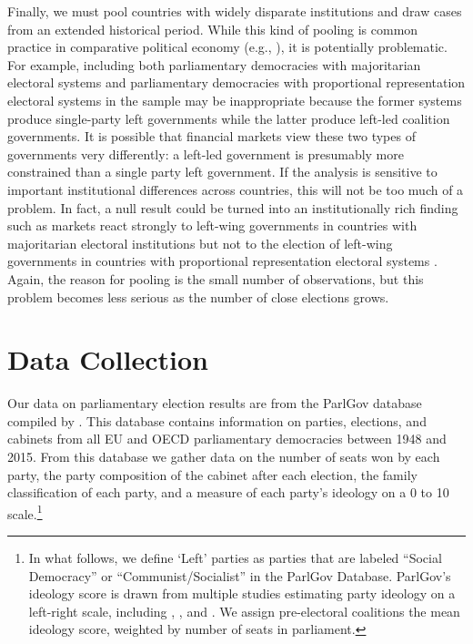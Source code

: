 \documentclass[12pt]{article}
\begin{document}
Finally, we must pool countries with widely disparate institutions and draw cases from an extended historical period. While this kind of pooling is common practice in comparative political economy (e.g., \citet{Beck1995}), it is potentially problematic. For example, including both parliamentary democracies with majoritarian electoral systems and parliamentary democracies with proportional representation electoral systems in the sample may be inappropriate because the former systems produce single-party left governments while the latter produce left-led coalition governments. It is possible that financial markets view these two types of governments very differently: a left-led government is presumably more constrained than a single party left government. If the analysis is sensitive to important institutional differences across countries, this will not be too much of a problem. In fact, a null result could be turned into an institutionally rich finding such as markets react strongly to left-wing governments in countries with majoritarian electoral institutions but not to the election of left-wing governments in countries with proportional representation electoral systems \citep{Freeman2000}. Again, the reason for pooling is the small number of observations, but this problem becomes less serious as the number of close elections grows. 

\section{Data Collection}

Our data on parliamentary election results are from the ParlGov database compiled by \citet{Doring2018}. This database contains information on parties, elections, and cabinets from all EU and OECD parliamentary democracies between 1948 and 2015. From this database we gather data on the number of seats won by each party, the party composition of the cabinet after each election, the family classification of each party, and a measure of each party's ideology on a 0 to 10 scale.\footnote{In what follows, we define `Left' parties as parties that are labeled ``Social Democracy'' or ``Communist/Socialist'' in the ParlGov Database. ParlGov's ideology score is drawn from multiple studies estimating party ideology on a left-right scale, including \citet{Castles1984}, \citet{Huber1995}, and \citet{Benoit2006}. We assign pre-electoral coalitions the mean ideology score, weighted by number of seats in parliament.}
\end{document}
